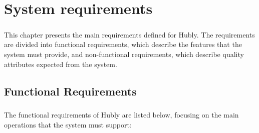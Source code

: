 \chapter{System requirements}\label{ch:system_requirements}


\paragraph{}This chapter presents the main requirements defined for Hubly. The requirements are divided into functional requirements, which describe the features that the system must provide, and non-functional requirements, which describe quality attributes expected from the system.

\section{Functional Requirements}
\paragraph{}The functional requirements of Hubly are listed below, focusing on the main operations that the system must support:

